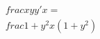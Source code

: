 \documentclass[preview]{standalone}
\begin{document}
\begin{align*}
\quad\\frac{xyy'}{x}=\quad\\frac{1+y^2}{x(1+y^2)}
\end{align*}
\end{document}
